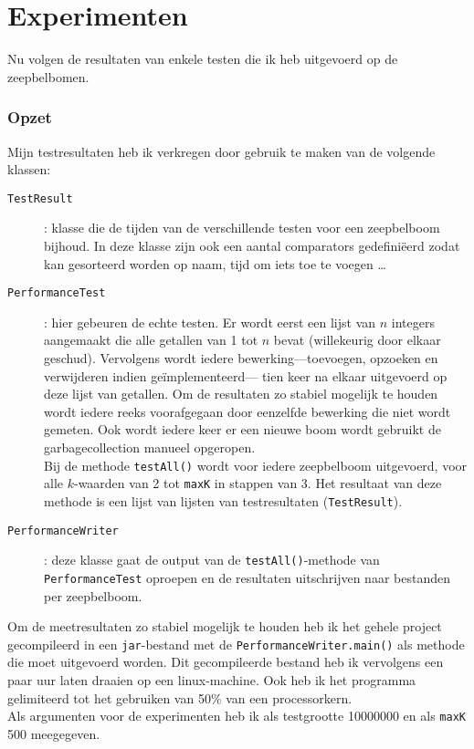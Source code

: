 \documentclass[12pt,hidelinks]{article}
\begin{document}
    \newpage
    \part{Experimenten}
    Nu volgen de resultaten van enkele testen die ik heb uitgevoerd op de zeepbelbomen.
    \section*{Opzet}
    Mijn testresultaten heb ik verkregen door gebruik te maken van de volgende klassen:
    \begin{description}
        \item[\tt TestResult]: klasse die de tijden van de verschillende testen voor een zeepbelboom bijhoud.
            In deze klasse zijn ook een aantal comparators gedefiniëerd zodat kan gesorteerd worden op naam, tijd om iets toe te voegen \ldots
        \item[\tt PerformanceTest]: hier gebeuren de echte testen. 
            Er wordt eerst een lijst van $n$ integers aangemaakt die alle getallen van 1 tot $n$ bevat (willekeurig door elkaar geschud).
            Vervolgens wordt iedere bewerking---toevoegen, opzoeken en verwijderen indien geïmplementeerd--- tien keer na elkaar uitgevoerd op deze lijst van getallen.
            Om de resultaten zo stabiel mogelijk te houden wordt iedere reeks voorafgegaan door eenzelfde bewerking die niet wordt gemeten.
            Ook wordt iedere keer er een nieuwe boom wordt gebruikt de garbagecollection manueel opgeropen.
            \\
            Bij de methode {\tt testAll()} wordt voor iedere zeepbelboom uitgevoerd, voor alle $k$-waarden van 2 tot {\tt maxK} in stappen van 3.
            Het resultaat van deze methode is een lijst van lijsten van testresultaten ({\tt TestResult}).
        \item[\tt PerformanceWriter]: deze klasse gaat de output van de {\tt testAll()}-methode van {\tt PerformanceTest} oproepen en de resultaten uitschrijven naar bestanden per zeepbelboom.
    \end{description}
    Om de meetresultaten zo stabiel mogelijk te houden heb ik het gehele project gecompileerd in een {\tt jar}-bestand met de {\tt PerformanceWriter.main()} als methode die moet uitgevoerd worden.
    Dit gecompileerde bestand heb ik vervolgens een paar uur laten draaien op een linux-machine. 
    Ook heb ik het programma gelimiteerd tot het gebruiken van 50\% van een processorkern.
    \\
    Als argumenten voor de experimenten heb ik als testgrootte 10000000 en als {\tt maxK}  500 meegegeven.
\end{document}
